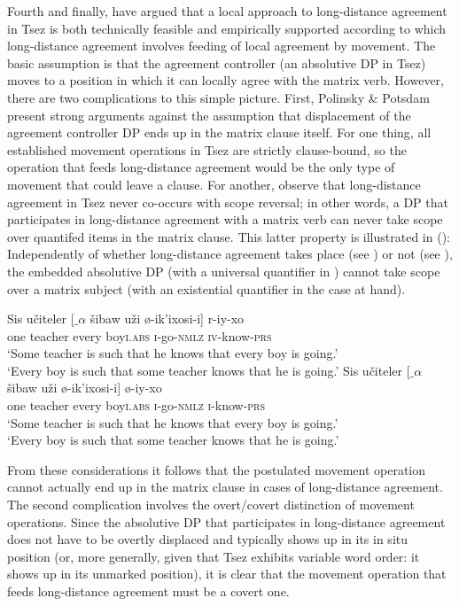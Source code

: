 \documentclass[output=paper
,modfonts
,nonflat]{langsci/langscibook}
\begin{document}
Fourth and finally, \cite{Polinsky&Potsdam:01} have argued that a
local approach to long-distance agreement in Tsez is both technically
feasible and empirically supported according to which long-distance
agreement involves feeding of local agreement by movement. The basic
assumption is that the agreement controller (an absolutive DP in Tsez)
moves to a position in which it can locally agree with the matrix
verb. However, there are two complications to this simple
picture. First, Polinsky \& Potsdam present strong arguments against
the assumption that displacement of the agreement controller DP ends
up in the matrix clause itself. For one thing, all established
movement operations in Tsez are strictly clause-bound, so the 
operation that feeds long-distance agreement would be the only type of
movement that could leave a clause. For another,
\cite{Polinsky&Potsdam:01} observe that long-distance
agreement in Tsez never co-occurs with scope reversal; in other words,
a DP that participates in long-distance agreement with a matrix verb
can never take scope over quantifed items in the matrix clause.
This latter property is illustrated in (\Next): Independently of whether
long-distance agreement takes place (see \Next[b]) or not (see
\Next[a]), the embedded absolutive DP (with a universal quantifier in
\Next) cannot take scope over a  matrix subject (with an existential
quantifier in the case at hand). 

\ea \label{ex:mueller:9}  \label{scope32}
\ea
\gll Sis u\v{c}iteler [$\_${$\alpha$} \v{s}ibaw u\v{z}i \o -ik'ixosi-\textbeltl i] r-iy-xo \\
     one teacher {} every boy{\scshape i}.{\scshape abs} {\scshape i}-go-{\scshape nmlz} {\scshape iv}-know-{\scshape prs}  \\
\glt `Some teacher is such that he knows that every boy is going.'\\
     `Every boy is such that some teacher knows that he is going.'
\ex
\gll Sis u\v{c}iteler [$\_${$\alpha$} \v{s}ibaw u\v{z}i \o -ik'ixosi-\textbeltl i] \o -iy-xo \\
     one teacher {} every boy{\scshape i}.{\scshape abs} {\scshape i}-go-{\scshape nmlz} {\scshape i}-know-{\scshape prs}  \\
\glt      `Some teacher is such that he knows that every boy is going.'\\
    `Every boy is such that some teacher knows that he is going.'
\z
\z

From these considerations it follows that the postulated movement operation
cannot actually end up in the matrix clause in cases of long-distance
agreement. The second complication involves the overt/covert
distinction of movement operations. Since the absolutive DP that participates in
  long-distance agreement does not have to be overtly
  displaced and typically shows up in its in situ position (or, more generally, given
  that Tsez exhibits variable word order: it shows up in its unmarked position),
  it is clear that the movement operation that feeds long-distance
  agreement must be a covert one. 
\end{document}

